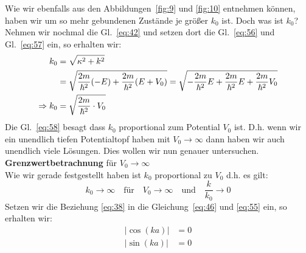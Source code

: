Wie wir ebenfalls aus den Abbildungen~\ref{fig:9} und \ref{fig:10} entnehmen
können, haben wir um so mehr gebundenen Zustände je größer $k_0$ ist. Doch was ist
$k_0$? Nehmen wir nochmal die Gl.~\eqref{eq:42} und setzen dort die
Gl.~\eqref{eq:56} und Gl.~\eqref{eq:57} ein, so erhalten wir:
\begin{align}
  k_0&=\sqrt{\kappa^2+k^2}\notag\\
  &=\sqrt{\frac{2m}{\hbar^2}(-E)+\frac{2m}{\hbar^2}(E+V_0)}
   = \sqrt{-\frac{2m}{\hbar^2}E+\frac{2m}{\hbar^2}E+\frac{2m}{\hbar^2}V_0}\notag\\
  \Rightarrow k_0&=\sqrt{\frac{2m}{\hbar^2}\cdot V_0} \label{eq:58}
\end{align}
Die Gl.~\eqref{eq:58} besagt dass $k_0$ proportional zum Potential $V_0$ ist.
D.h. wenn wir ein unendlich tiefen Potentialtopf haben mit $V_0 \rightarrow
\infty$ dann haben wir auch unendlich viele Lösungen. Dies wollen wir nun
genauer untersuchen.\\

\textbf{Grenzwertbetrachnung} für $V_0\rightarrow \infty$\\
Wie wir gerade festgestellt haben ist $k_0$ proportional zu $V_0$ d.h. es gilt:
\begin{equation}
  \label{eq:38}
  k_0 \rightarrow \infty \quad \text{für} \quad V_0 \rightarrow \infty
  \quad \text{und} \quad \frac k {k_0} \rightarrow 0
\end{equation}
Setzen wir die Beziehung \eqref{eq:38} in die Gleichung~\eqref{eq:46} und
\eqref{eq:55} ein, so erhalten wir:
\begin{subequations}
  \begin{align}
    |\cos(ka)| &= 0\label{eq:41a}\\
    |\sin(ka)| &= 0\label{eq:41b}
  \end{align}
\end{subequations}


